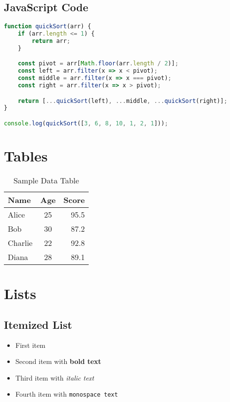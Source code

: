 \documentclass{article}
\begin{document}
\subsection{JavaScript Code}
\begin{lstlisting}[language=JavaScript, caption=JavaScript example]
function quickSort(arr) {
    if (arr.length <= 1) {
        return arr;
    }

    const pivot = arr[Math.floor(arr.length / 2)];
    const left = arr.filter(x => x < pivot);
    const middle = arr.filter(x => x === pivot);
    const right = arr.filter(x => x > pivot);

    return [...quickSort(left), ...middle, ...quickSort(right)];
}

console.log(quickSort([3, 6, 8, 10, 1, 2, 1]));
\end{lstlisting}

\section{Tables}

\begin{table}[h]
\centering
\caption{Sample Data Table}
\begin{tabular}{|l|c|r|}
\hline
\textbf{Name} & \textbf{Age} & \textbf{Score} \\
\hline
Alice & 25 & 95.5 \\
Bob & 30 & 87.2 \\
Charlie & 22 & 92.8 \\
Diana & 28 & 89.1 \\
\hline
\end{tabular}
\end{table}

\section{Lists}

\subsection{Itemized List}
\begin{itemize}
    \item First item
    \item Second item with \textbf{bold text}
    \item Third item with \textit{italic text}
    \item Fourth item with \texttt{monospace text}
\end{itemize}
\end{document}
